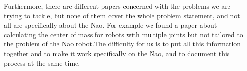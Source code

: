 \documentclass[a4paper]{article}
\begin{document}
Furthermore, there are different papers concerned with the problems we are
trying to tackle, but none of them cover the whole problem statement, and not
all are specifically about the Nao. For example we found a paper about
calculating the center of mass for robots with multiple joints but not tailored
to the problem of the Nao robot.The difficulty for us is to put all this
information together and to make it work specifically on the Nao, and to
document this process at the same time.



\end{document}
